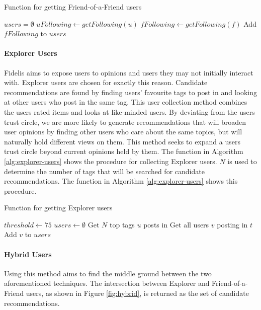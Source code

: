 \begin{algorithm}
\caption{Function for getting Friend-of-a-Friend users}
\label{alg:fof-users}
\begin{algorithmic}[1]
	\State $users = \emptyset$
	\State $uFollowing\gets getFollowing(u)$
		\State $fFollowing\gets getFollowing(f)$
		\State Add $fFollowing$ to $users$
	\EndFor
	\State {}		
\EndFunction
\end{algorithmic}
\end{algorithm}

\paragraph{Explorer Users}
Fidelis aims to expose users to opinions and users they may not initially interact with. Explorer users are chosen for exactly this reason. Candidate recommendations are found by finding users' favourite tags to post in and looking at other users who post in the same tag. This user collection method combines the users rated items and looks at like-minded users. By deviating from the users trust circle, we are more likely to generate recommendations that will broaden user opinions by finding other users who care about the same topics, but will naturally hold different views on them. This method seeks to expand a users trust circle beyond current opinions held by them. The function in Algorithm \ref{alg:explorer-users} shows the procedure for collecting Explorer users. $N$ is used to determine the number of tags that will be searched for candidate recommendations. The function in Algorithm \ref{alg:explorer-users} shows this procedure.

\begin{algorithm}
\caption{Function for getting Explorer users}
\label{alg:explorer-users}
\begin{algorithmic}[1]
	\State $threshold\gets 75$
	\State $users\gets \emptyset$
	\State Get $N$ top tags $u$ posts in
		\State Get all users $v$ posting in $t$
			\State Add $v$ to $users$
		\EndIf
	\EndFor
	\State {}
\EndFunction
\end{algorithmic}
\end{algorithm}

\paragraph{Hybrid Users}
Using this method aims to find the middle ground between the two aforementioned techniques. The intersection between Explorer and Friend-of-a-Friend users, as shown in Figure \ref{fig:hybrid}, is returned as the set of candidate recommendations. 

